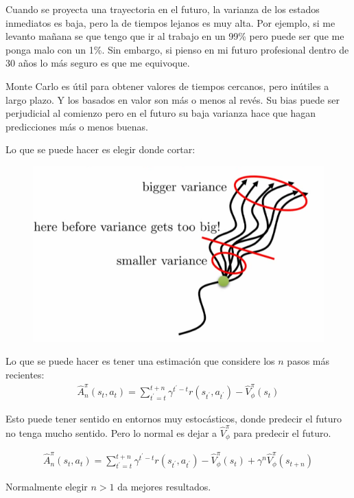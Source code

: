 Cuando se proyecta una trayectoria en el futuro, la varianza de los estados inmediatos es baja,
pero la de tiempos lejanos es muy alta. Por ejemplo, si me levanto mañana se que tengo que ir al
trabajo en un 99\% pero puede ser que me ponga malo con un 1\%. Sin embargo, si pienso en mi
futuro profesional dentro de 30 años lo más seguro es que me equivoque.

Monte Carlo es útil para obtener valores de tiempos cercanos, pero inútiles a largo plazo. Y los
basados en valor son más o menos al revés. Su bias puede ser perjudicial al comienzo pero
en el futuro su baja varianza hace que hagan predicciones más o menos buenas.

Lo que se puede hacer es elegir donde cortar:

\begin{figure}[htpb]
	\centering
	\includegraphics[width=0.5\linewidth]{figures/2020-06-14-130429_537x324_scrot.png}
\end{figure}

Lo que se puede hacer es tener una estimación que considere los $n$ pasos más recientes:
\begin{align}
\hat { A } _ { n } ^ { \pi } ( s _ { t } , a _ { t } ) = \sum _ { t ^ { \prime } = t } ^ { t + n } \gamma ^ { t ^ { \prime } - t } r ( s _ { t ^ { \prime } } , a _ { t ^ { \prime } } ) - \hat { V } _ { \phi } ^ { \pi } ( s _ { t } )
\end{align}

Esto puede tener sentido en entornos muy estocásticos, donde predecir el futuro no tenga
mucho sentido. Pero lo normal es dejar a $\hat{V}_\phi^\pi$ para predecir el futuro.

\begin{align}
    \label{eq:an}
\hat { A } _ { n } ^ { \pi } ( s _ { t } , a _ { t } ) = \sum _ { t ^ { \prime } = t } ^ { t + n
} \gamma ^ { t ^ { \prime } - t } r ( s _ { t ^ { \prime } } , a _ { t ^ { \prime } } ) - \hat {
V } _ { \phi } ^ { \pi } ( s _ { t } ) + \gamma^n \hat{V}_\phi^\pi(s_{t+n})
\end{align}

Normalmente elegir $n>1$ da mejores resultados.


